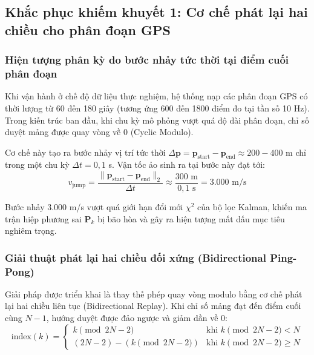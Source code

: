 \subsection{Khắc phục khiếm khuyết 1: Cơ chế phát lại hai chiều cho phân đoạn GPS}

\subsubsection{Hiện tượng phân kỳ do bước nhảy tức thời tại điểm cuối phân đoạn}

\hspace{0.5cm} Khi vận hành ở chế độ dữ liệu thực nghiệm, hệ thống nạp các phân đoạn GPS có thời lượng từ 60 đến 180 giây (tương ứng 600 đến 1800 điểm đo tại tần số 10 Hz). Trong kiến trúc ban đầu, khi chu kỳ mô phỏng vượt quá độ dài phân đoạn, chỉ số duyệt mảng được quay vòng về 0 (Cyclic Modulo).

Cơ chế này tạo ra bước nhảy vị trí tức thời $\Delta \mathbf{p} = \mathbf{p}_{\text{start}} - \mathbf{p}_{\text{end}} \approx 200 - 400$ m chỉ trong một chu kỳ $\Delta t = 0{,}1$ s. Vận tốc ảo sinh ra tại bước này đạt tới:
\begin{equation}
v_{\text{jump}} = \frac{\|\mathbf{p}_{\text{start}} - \mathbf{p}_{\text{end}}\|_2}{\Delta t} \approx \frac{300\text{ m}}{0{,}1\text{ s}} = 3.000\text{ m/s}
\label{eq:teleportation-virtual-velocity}
\end{equation}

Bước nhảy $3.000$ m/s vượt quá giới hạn đổi mới $\chi^2$ của bộ lọc Kalman, khiến ma trận hiệp phương sai $\mathbf{P}_k$ bị bão hòa và gây ra hiện tượng mất dấu mục tiêu nghiêm trọng.

\subsubsection{Giải thuật phát lại hai chiều đối xứng (Bidirectional Ping-Pong)}

\hspace{0.5cm} Giải pháp được triển khai là thay thế phép quay vòng modulo bằng cơ chế phát lại hai chiều liên tục (Bidirectional Replay). Khi chỉ số mảng đạt đến điểm cuối cùng $N-1$, hướng duyệt được đảo ngược và giảm dần về 0:
\begin{equation}
\text{index}(k) = \begin{cases}
k \pmod{2N - 2} & \text{khi } k \pmod{2N - 2} < N \\
(2N - 2) - (k \pmod{2N - 2}) & \text{khi } k \pmod{2N - 2} \ge N
\end{cases}
\label{eq:pingpong-indexing-formula}
\end{equation}

